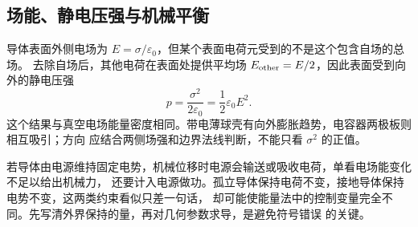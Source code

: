 \subsection*{场能、静电压强与机械平衡}

导体表面外侧电场为 $E=\sigma/\varepsilon_0$，但某个表面电荷元受到的不是这个包含自场的总场。
去除自场后，其他电荷在表面处提供平均场 $E_{\rm other}=E/2$，因此表面受到向外的静电压强
\[
 p=\frac{\sigma^2}{2\varepsilon_0}
 =\frac12\varepsilon_0E^2.
\]
这个结果与真空电场能量密度相同。带电薄球壳有向外膨胀趋势，电容器两极板则相互吸引；方向
应结合两侧场强和边界法线判断，不能只看 $\sigma^2$ 的正值。

若导体由电源维持固定电势，机械位移时电源会输送或吸收电荷，单看电场能变化不足以给出机械力，
还要计入电源做功。孤立导体保持电荷不变，接地导体保持电势不变，这两类约束看似只差一句话，
却可能使能量法中的控制变量完全不同。先写清外界保持的量，再对几何参数求导，是避免符号错误
的关键。
